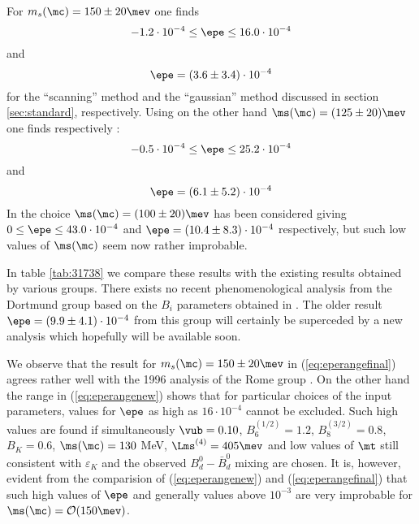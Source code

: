 For $m_s(\mc)=150\pm20\mev$ one finds \cite{BJL96a}
\begin{equation}
-1.2 \cdot 10^{-4} \le \epe \le 16.0 \cdot 10^{-4}
\label{eq:eperangenew}
\end{equation}
and
\begin{equation}
\epe= ( 3.6\pm 3.4) \cdot 10^{-4}
\label{eq:eperangefinal}
\end{equation}
for the ``scanning'' method and the ``gaussian'' method discussed
in section \ref{sec:standard}, respectively.
Using on the other hand $\ms(\mc)=(125\pm20)\mev$ one finds 
respectively \cite{BJL96b}:
\begin{equation}
-0.5\cdot 10^{-4} \le \epe \le 25.2 \cdot 10^{-4}
\label{eq:eperangenewa}
\end{equation}
and
\begin{equation}
\epe= ( 6.1\pm 5.2) \cdot 10^{-4}
\label{eq:eperangefinala}
\end{equation}
In \cite{BJL96a} the choice $\ms(\mc)=(100\pm20)\mev$ has been
considered giving $0 \le \epe \le 43.0 \cdot 10^{-4}$ and
$\epe= ( 10.4\pm 8.3) \cdot 10^{-4}$ respectively, but such low
values of $\ms(\mc)$ seem now rather improbable.

In table \ref{tab:31738} we compare these results with the existing
results obtained by various groups. There exists no recent 
phenomenological analysis from the Dortmund group based on the $B_i$
parameters obtained in \cite{DORT98}. The older result 
$\epe=(9.9\pm4.1)\cdot 10^{-4}$ from this group will certainly be
superceded by a new analysis which hopefully will be available soon.

We observe that
the result for $m_s( \mc)=150\pm20\mev$ 
in (\ref{eq:eperangefinal}) agrees rather well with
the 1996 analysis of the Rome group \cite{ciuchini:96}.
On the other hand the range in (\ref{eq:eperangenew}) shows that for
particular choices of the input parameters, values for $\epe$ as high as
$16\cdot 10^{-4}$ cannot be excluded. Such high values are
found if simultaneously  $\vub=0.10$, $B_6^{(1/2)}=1.2$, 
$B_8^{(3/2)}=0.8$, $B_K=0.6$,
$\ms(\mc)=130$ MeV, $\Lms^{(4)}=405\mev$ and low values of $\mt$ still
consistent with $\varepsilon_K$ and the observed $B_d^0-\bar B_d^0$ 
mixing
are chosen. It is, however, evident from  the comparision of
(\ref{eq:eperangenew}) and (\ref{eq:eperangefinal})  that such 
high values of $\epe$ and generally values above $10^{-3}$ 
are very improbable for $\ms(\mc)={\cal O}(150\mev)$.


